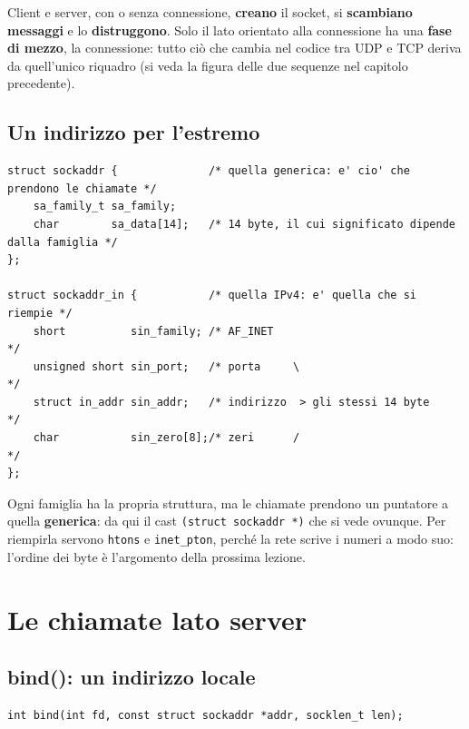 Client e server, con o senza connessione, \textbf{creano} il socket, si \textbf{scambiano messaggi} e lo
\textbf{distruggono}. Solo il lato orientato alla connessione ha una \textbf{fase di mezzo}, la connessione: tutto ciò
che cambia nel codice tra UDP e TCP deriva da quell'unico riquadro (si veda la figura delle due sequenze nel capitolo
precedente).

\subsection{Un indirizzo per l'estremo}

\begin{lstlisting}[language={[POSIX]C}]
struct sockaddr {              /* quella generica: e' cio' che prendono le chiamate */
    sa_family_t sa_family;
    char        sa_data[14];   /* 14 byte, il cui significato dipende dalla famiglia */
};

struct sockaddr_in {           /* quella IPv4: e' quella che si riempie */
    short          sin_family; /* AF_INET                              */
    unsigned short sin_port;   /* porta     \                          */
    struct in_addr sin_addr;   /* indirizzo  > gli stessi 14 byte      */
    char           sin_zero[8];/* zeri      /                          */
};
\end{lstlisting}

Ogni famiglia ha la propria struttura, ma le chiamate prendono un puntatore a quella \textbf{generica}: da qui il cast
\texttt{(struct sockaddr *)} che si vede ovunque. Per riempirla servono \texttt{htons} e \texttt{inet\_pton}, perché la
rete scrive i numeri a modo suo: l'ordine dei byte è l'argomento della prossima lezione.

\section{Le chiamate lato server}

\subsection{bind(): un indirizzo locale}

\begin{lstlisting}[language={[POSIX]C}]
int bind(int fd, const struct sockaddr *addr, socklen_t len);
\end{lstlisting}

